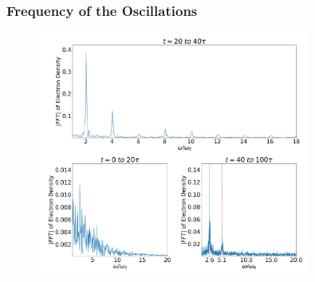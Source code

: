 \documentclass{beamer}
\begin{document}
\begin{frame}
    \frametitle{Frequency of the Oscillations}
    \begin{figure}
        \centering
        \includegraphics[width=0.8\textwidth, height=0.8\textheight]{images/oscillation2.jpg}
        \label{fig:Oscillations2}
    \end{figure}
\end{frame}
\end{document}

